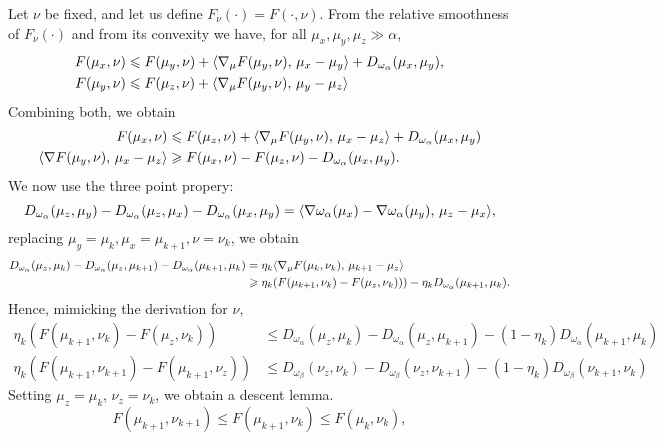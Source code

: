 \documentclass[a4paper, 10pt]{article}
\begin{document}
Let $\nu$ be fixed, and let us define $F_\nu(\cdot) = F(\cdot, \nu)$. From the relative
smoothness of $F_\nu(\cdot)$ and from its convexity we have, for all 
$\mu_x, \mu_y, \mu_z \gg \alpha$,
\begin{align}
    F(\mu_x, \nu) &\leqslant F(\mu_y, \nu)
     + \langle \nabla_\mu F(\mu_y, \nu),\,\mu_x- \mu_y\rangle + D_{\omega_\alpha}(\mu_x, \mu_y), \\
    F(\mu_y, \nu) &\leqslant F(\mu_z, \nu) + \langle \nabla_\mu F(\mu_y, \nu),\,\mu_y - \mu_z\rangle
\end{align}
Combining both, we obtain
\begin{align}
    F(\mu_x, \nu) &\leqslant F(\mu_z, \nu) + 
    \langle \nabla_\mu F(\mu_y, \nu),\,\mu_x - \mu_z\rangle + D_{\omega_\alpha}(\mu_x, \mu_y) \\
    \langle \nabla F(\mu_y, \nu),\,\mu_x - \mu_z\rangle 
    &\geqslant F(\mu_x, \nu) - F(\mu_z, \nu) - D_{\omega_\alpha}(\mu_x, \mu_y).
\end{align}
We now use the three point propery:
\begin{equation}
    D_{\omega_\alpha}(\mu_z, \mu_y) - D_{\omega_\alpha}(\mu_z, \mu_x) 
    - D_{\omega_\alpha}(\mu_x, \mu_y) 
    = \langle \nabla \omega_\alpha(\mu_x) - \nabla \omega_\alpha(\mu_y),\,\mu_z - \mu_x\rangle,
\end{equation}
replacing $\mu_y = \mu_{k}, \mu_x = \mu_{k+1}, \nu = \nu_k$, we obtain
\begin{align}
    D_{\omega_\alpha}(\mu_z, \mu_k) - D_{\omega_\alpha}(\mu_z, \mu_{k+1}) 
    - D_{\omega_\alpha}(\mu_{k+1}, \mu_k) &=
     \eta_k \langle \nabla_\mu F(\mu_k, \nu_k),\,\mu_{k+1} - \mu_z\rangle \\
    &\geqslant \eta_k (F(\mu_{k+1}, \nu_k) - F(\mu_z, \nu_k)))
     - \eta_k D_{\omega_\alpha}   (\mu_{k+1},\mu_k).
\end{align}
Hence, mimicking the derivation for $\nu$,
\begin{align}\label{eq:mirror_ineq}
    \eta_k (F(\mu_{k+1},\nu_k) - F(\mu_z, \nu_k)) &\leq 
    D_{\omega_\alpha}(\mu_z, \mu_k) - D_{\omega_\alpha}(\mu_z, \mu_{k+1}) 
    - (1 - \eta_k) D_{\omega_\alpha}(\mu_{k+1}, \mu_k) \\
    \eta_k (F(\mu_{k+1},\nu_{k+1}) - F(\mu_{k+1}, \nu_z)) &\leq 
    D_{\omega_\beta}(\nu_z, \nu_k) - D_{\omega_\beta}(\nu_z, \nu_{k+1}) 
    - (1 - \eta_k) D_{\omega_\beta}(\nu_{k+1}, \nu_k)
\end{align}
Setting $\mu_z = \mu_{k}$, $\nu_z = \nu_k$, we obtain a descent lemma.
\begin{equation}
    F(\mu_{k+1}, \nu_{k+1}) \leq F(\mu_{k+1}, \nu_{k}) \leq F(\mu_{k}, \nu_{k}),
\end{equation}
\end{document}
